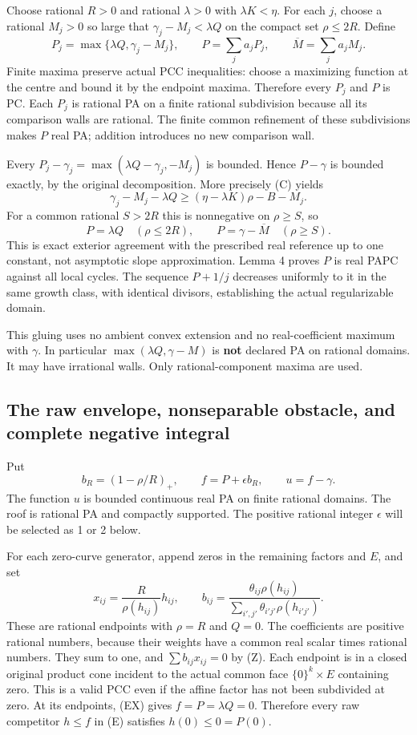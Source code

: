 \documentclass[
  11pt,
]{article}
\begin{document}
Choose rational \(R>0\) and rational \(\lambda>0\) with
\(\lambda K<\eta\). For each \(j\), choose a rational \(M_j>0\) so large
that \(\gamma_j-M_j<\lambda Q\) on the compact set \(\rho\leq2R\).
Define \[
P_j=\max\{\lambda Q,\gamma_j-M_j\},\qquad
P=\sum_j a_jP_j,\qquad \overline M=\sum_ja_jM_j.
\tag{A}
\] Finite maxima preserve actual PCC inequalities: choose a maximizing
function at the centre and bound it by the endpoint maxima. Therefore
every \(P_j\) and \(P\) is PC. Each \(P_j\) is rational PA on a finite
rational subdivision because all its comparison walls are rational. The
finite common refinement of these subdivisions makes \(P\) real PA;
addition introduces no new comparison wall.

Every \(P_j-\gamma_j=\max(\lambda Q-\gamma_j,-M_j)\) is bounded. Hence
\(P-\gamma\) is bounded exactly, by the original decomposition. More
precisely (C) yields \[
\gamma_j-M_j-\lambda Q\geq(\eta-\lambda K)\rho-B-M_j.
\] For a common rational \(S>2R\) this is nonnegative on \(\rho\geq S\),
so \[
P=\lambda Q\quad(\rho\leq2R),\qquad
P=\gamma-\overline M\quad(\rho\geq S).
\tag{EX}
\] This is exact exterior agreement with the prescribed real reference
up to one constant, not asymptotic slope approximation. Lemma 4 proves
\(P\) is real PAPC against all local cycles. The sequence \(P+1/j\)
decreases uniformly to it in the same growth class, with identical
divisors, establishing the actual regularizable domain.

This gluing uses no ambient convex extension and no real-coefficient
maximum with \(\gamma\). In particular \(\max(\lambda Q,\gamma-M)\) is
\textbf{not} declared PA on rational domains. It may have irrational
walls. Only rational-component maxima are used.

\subsection{The raw envelope, nonseparable obstacle, and complete
negative
integral}\label{the-raw-envelope-nonseparable-obstacle-and-complete-negative-integral}

Put \[
b_R=(1-\rho/R)_+,\qquad f=P+\epsilon b_R,\qquad u=f-\gamma.
\tag{O}
\] The function \(u\) is bounded continuous real PA on finite rational
domains. The roof is rational PA and compactly supported. The positive
rational integer \(\epsilon\) will be selected as 1 or 2 below.

For each zero-curve generator, append zeros in the remaining factors and
\(E\), and set \[
x_{ij}=\frac R{\rho(h_{ij})}h_{ij},\qquad
b_{ij}=\frac{\theta_{ij}\rho(h_{ij})}{\sum_{i',j'}\theta_{i'j'}\rho(h_{i'j'})}.
\tag{PCC0}
\] These are rational endpoints with \(\rho=R\) and \(Q=0\). The
coefficients are positive rational numbers, because their weights have a
common real scalar times rational numbers. They sum to one, and
\(\sum b_{ij}x_{ij}=0\) by (Z). Each endpoint is in a closed original
product cone incident to the actual common face \(\{0\}^k\times E\)
containing zero. This is a valid PCC even if the affine factor has not
been subdivided at zero. At its endpoints, (EX) gives
\(f=P=\lambda Q=0\). Therefore every raw competitor \(h\leq f\) in (E)
satisfies \(h(0)\leq0=P(0)\).
\end{document}
